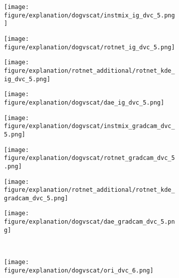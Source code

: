 \documentclass{article} \usepackage{iclr2021_conference,times}
\begin{document}
\begin{figure}[h!]
\begin{subfigure}{.11\textwidth}
  \centering
  \texttt{[image: figure/explanation/dogvscat/instmix\_ig\_dvc\_5.png]}
\end{subfigure}
\hspace{-2mm}
\begin{subfigure}{.11\textwidth}
  \centering
  \texttt{[image: figure/explanation/dogvscat/rotnet\_ig\_dvc\_5.png]}
\end{subfigure}
\hspace{-2mm}
\begin{subfigure}{.11\textwidth}
  \centering
  \texttt{[image: figure/explanation/rotnet\_additional/rotnet\_kde\_ig\_dvc\_5.png]}
\end{subfigure}
\hspace{-2mm}
\begin{subfigure}{.11\textwidth}
  \centering
  \texttt{[image: figure/explanation/dogvscat/dae\_ig\_dvc\_5.png]}
\end{subfigure}
\hspace{-2mm}
\begin{subfigure}{.11\textwidth}
  \centering
  \texttt{[image: figure/explanation/dogvscat/instmix\_gradcam\_dvc\_5.png]}
\end{subfigure}
\hspace{-2mm}
\begin{subfigure}{.11\textwidth}
  \centering
  \texttt{[image: figure/explanation/dogvscat/rotnet\_gradcam\_dvc\_5.png]}
\end{subfigure}
\hspace{-2mm}
\begin{subfigure}{.11\textwidth}
  \centering
  \texttt{[image: figure/explanation/rotnet\_additional/rotnet\_kde\_gradcam\_dvc\_5.png]}
\end{subfigure}
\hspace{-2mm}
\begin{subfigure}{.11\textwidth}
  \centering
  \texttt{[image: figure/explanation/dogvscat/dae\_gradcam\_dvc\_5.png]}
\end{subfigure}\\
\begin{subfigure}{.11\textwidth}
  \centering
  \texttt{[image: figure/explanation/dogvscat/ori\_dvc\_6.png]}
\end{subfigure}
\hspace{-2mm}
\begin{subfigure}{.11\textwidth}

\end{subfigure}
\end{figure}
\end{document}
